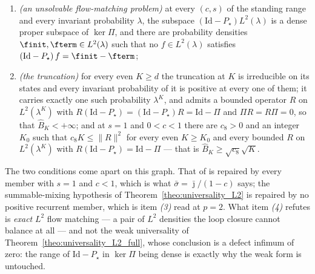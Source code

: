 \begin{theorem}
\begin{enumerate}
    backward-trajectory length is finite, $\bar\sigma=\bar\jmath/(1-c)$, and there are
    $0<c_1\leq c_2$ and an integer $m_2>d$ with
    \begin{equation}\label{eq:lean_rate}
        c_1\,m\,\left\|\left(\mathrm{Id}-P_\star\right)f_m\right\|^2_{L^2(\lambda)}
        \;\leq\;4\,c_2\left(p_*-1\right)\left\|f_m\right\|^2_{L^2(\lambda)}
    \end{equation}
    for every $m\geq m_2$ --- a $\sqrt m$ rate along the trial functions, and not a bound on
    $\widehat B$, which is $+\infty$ there;
    \item \emph{(an unsolvable flow-matching problem)} at every $(c,s)$ of the standing range
    and every invariant probability $\lambda$, the subspace
    $\left(\mathrm{Id}-P_\star\right)L^2(\lambda)$ is a dense proper subspace of $\ker\Pi$, and
    there are probability densities $\finit,\fterm\in L^2(\lambda)$ such that no
    $f\in L^2(\lambda)$ satisfies $\left(\mathrm{Id}-P_\star\right)f=\finit-\fterm$;
    \item \emph{(the truncation)} for every even $K\geq d$ the truncation at $K$ is irreducible
    on its states and every invariant probability of it is positive at every one of them; it
    carries exactly one such probability $\lambda^K$, and admits a bounded operator $R$ on
    $L^2(\lambda^K)$ with
    $R(\mathrm{Id}-P_\star)=(\mathrm{Id}-P_\star)R=\mathrm{Id}-\Pi$ and $\Pi R=R\Pi=0$, so
    that $\widehat B_K<+\infty$; and at $s=1$ and $0<c<1$ there are $c_8>0$ and an integer $K_0$
    such that $c_8K\leq\|R\|^2$ for every even $K\geq K_0$ and every bounded $R$ on
    $L^2(\lambda^K)$ with $R(\mathrm{Id}-P_\star)=\mathrm{Id}-\Pi$ --- that is
    $\widehat B_K\geq\sqrt{c_8}\sqrt K$.
\end{enumerate}
\end{theorem}

The two conditions come apart on this graph. That of \citet{morozov2025revisiting} is repaired
by every member with $s=1$ and $c<1$, which is what $\bar\sigma=\bar\jmath/(1-c)$ says; the
summable-mixing hypothesis of Theorem~\ref{theo:universality_L2} is repaired by no positive
recurrent member, which is item \emph{(3)} read at $p=2$. What item \emph{(4)} refutes is
\emph{exact} $L^2$ flow matching --- a pair of $L^2$ densities the loop closure cannot balance
at all --- and not the weak universality of Theorem~\ref{theo:universality_L2_full}, whose
conclusion is a defect infimum of zero: the range of $\mathrm{Id}-P_\star$ in $\ker\Pi$ being
dense is exactly why the weak form is untouched.

